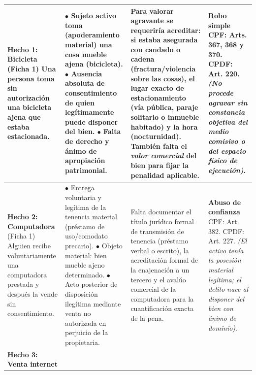 \documentclass[spanish,letterpaper,oneside]{article}
\begin{document}
\begin{landscape}
\begin{longtable}{@{}L{3.3cm} L{6.15cm} L{6.15cm} L{6.15cm}@{}}
\textbf{Hecho 1: Bicicleta}\newline
(Ficha 1)\newline
Una persona toma sin autorizaci\'on una bicicleta ajena que estaba estacionada. & 
$\bullet$ Sujeto activo toma (apoderamiento material) una cosa mueble ajena (bicicleta).\newline
$\bullet$ Ausencia absoluta de consentimiento de quien leg\'itimamente puede disponer del bien.\newline
$\bullet$ Falta de derecho y \'animo de apropiaci\'on patrimonial. & 
\textbf{Para valorar agravante se requerir\'ia acreditar:} si estaba asegurada con candado o cadena (fractura/violencia sobre las cosas), el lugar exacto de estacionamiento (v\'ia p\'ublica, paraje solitario o inmueble habitado) y la hora (nocturnidad). Tambi\'en falta el \emph{valor comercial} del bien para fijar la penalidad aplicable. & 
\textbf{Robo simple}\newline
CPF: Arts. 367, 368 y 370.\newline
CPDF: Art. 220.\newline
\emph{(No procede agravar sin constancia objetiva del medio comisivo o del espacio f\'isico de ejecuci\'on)}. \\
\midrule
{}
\textbf{Hecho 2: Computadora}\newline
(Ficha 1)\newline
Alguien recibe voluntariamente una computadora prestada y despu\'es la vende sin consentimiento. & 
$\bullet$ Entrega voluntaria y leg\'itima de la tenencia material (pr\'estamo de uso/comodato precario).\newline
$\bullet$ Objeto material: bien mueble ajeno determinado.\newline
$\bullet$ Acto posterior de disposici\'on ileg\'itima mediante venta no autorizada en perjuicio de la propietaria. & 
Falta documentar el t\'itulo jur\'idico formal de transmisi\'on de tenencia (pr\'estamo verbal o escrito), la acreditaci\'on formal de la enajenaci\'on a un tercero y el aval\'uo comercial de la computadora para la cuantificaci\'on exacta de la pena. & 
\textbf{Abuso de confianza}\newline
CPF: Art. 382.\newline
CPDF: Art. 227.\newline
\emph{(El activo ten\'ia la posesi\'on material leg\'itima; el delito nace al disponer del bien con \'animo de dominio)}. \\
\midrule
\textbf{Hecho 3: Venta internet}\newline

\end{longtable}
\end{landscape}
\end{document}

